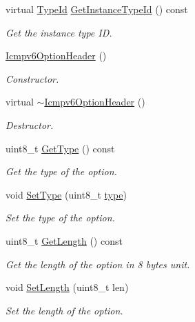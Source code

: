 \begin{DoxyCompactItemize}
\item 
virtual \hyperlink{classns3_1_1TypeId}{Type\+Id} \hyperlink{classns3_1_1Icmpv6OptionHeader_a772875e860bb7d9e13cb9bb653727edb}{Get\+Instance\+Type\+Id} () const 
\begin{DoxyCompactList}\small\item\em Get the instance type ID. \end{DoxyCompactList}\item 
\hyperlink{classns3_1_1Icmpv6OptionHeader_a089cd1c96256df43080de0ac749e3983}{Icmpv6\+Option\+Header} ()
\begin{DoxyCompactList}\small\item\em Constructor. \end{DoxyCompactList}\item 
virtual \hyperlink{classns3_1_1Icmpv6OptionHeader_a31c29dc398bd045d79d38c1768edbbfa}{$\sim$\+Icmpv6\+Option\+Header} ()
\begin{DoxyCompactList}\small\item\em Destructor. \end{DoxyCompactList}\item 
uint8\+\_\+t \hyperlink{classns3_1_1Icmpv6OptionHeader_a7a8cca8443e708b23373fa6f4c7b072f}{Get\+Type} () const 
\begin{DoxyCompactList}\small\item\em Get the type of the option. \end{DoxyCompactList}\item 
void \hyperlink{classns3_1_1Icmpv6OptionHeader_a05189e19a5b625aeafd808962821a27c}{Set\+Type} (uint8\+\_\+t \hyperlink{visualizer-ideas_8txt_add98db9e15e2a58cf2b57623e7aa893a}{type})
\begin{DoxyCompactList}\small\item\em Set the type of the option. \end{DoxyCompactList}\item 
uint8\+\_\+t \hyperlink{classns3_1_1Icmpv6OptionHeader_a46ab13e3950e89a27445926c29c6ab0f}{Get\+Length} () const 
\begin{DoxyCompactList}\small\item\em Get the length of the option in 8 bytes unit. \end{DoxyCompactList}\item 
void \hyperlink{classns3_1_1Icmpv6OptionHeader_ae4a34624523bdfe2355e2ecefa022515}{Set\+Length} (uint8\+\_\+t len)
\begin{DoxyCompactList}\small\item\em Set the length of the option. \end{DoxyCompactList}\item 

\end{DoxyCompactItemize}
